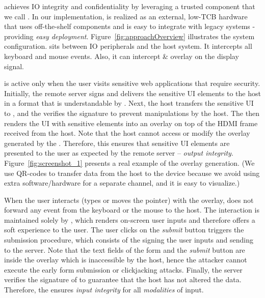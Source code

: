 \name achieves IO integrity and confidentiality by leveraging a trusted component that we call \device. In our implementation, \device is realized as an external, low-TCB hardware that uses off-the-shelf components and \device is easy to integrate with legacy systems - providing \emph{easy deployment}. 
Figure~\ref{fig:approachOverview} illustrates the system configuration. \device sits between IO peripherals and the host system. It intercepts all keyboard and mouse events. Also, it can intercept \& overlay on the display signal. 

\device is active only when the user visits sensitive web applications that require \name security.
Initially, the remote server signs and delivers the sensitive UI elements to the host in a format that is understandable by \device. Next, the host transfers the sensitive UI to \device, and the \device verifies the signature to prevent manipulations by the host. The \device then renders the UI with sensitive elements into an overlay on top of the HDMI frame received from the host. Note that the host cannot access or modify the overlay generated by the \device. Therefore, this ensures that sensitive UI elements are presented to the user as expected by the remote server -- \emph{output integrity}. Figure~\ref{fig:screenshot_1} presents a real example of the overlay generation. (We use QR-codes to transfer data from the host to the device because we avoid using extra software/hardware for a separate channel, and it is easy to visualize.)

When the user interacts (types or moves the pointer) with the overlay, \device does not forward any event from the keyboard or the mouse to the host. The interaction is maintained solely by \device, which renders on-screen user inputs and therefore offers a soft experience to the user. The user clicks on the \emph{submit} button triggers the submission procedure, which consists of the \device signing the user inputs and sending to the server. Note that the text fields of the form and the \emph{submit} button are inside the overlay which is inaccessible by the host, hence the attacker cannot execute the early form submission or clickjacking attacks. Finally, the server verifies the signature of \device to guarantee that the host has not altered the data. Therefore, the \device ensures \emph{input integrity} for all \emph{modalities} of input.



